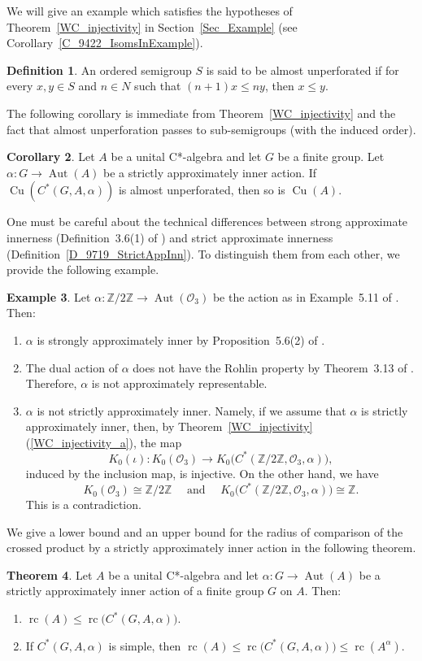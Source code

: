 \documentclass[10pt]{amsart}
\numberwithin{equation}{section}
\theoremstyle{definition}
\newtheorem{thm}{Theorem}[section]
\newtheorem{dfn}[thm]{Definition}
\newtheorem{cor}[thm]{Corollary}
\newtheorem{exa}[thm]{Example}
\newcommand{\af}{\alpha}
\newcommand{\Cu}{{\operatorname{Cu}}}
\newcommand{\Aut}{{\operatorname{Aut}}}
\newcommand{\rc}{{\operatorname{rc}}}
\newcommand{\ca}{C*-algebra}
\newcommand{\CGAa}{C^* (G, A, \af)}
\begin{document}
We will give an example which satisfies the hypotheses 
of Theorem~\ref{WC_injectivity} in Section~\ref{Sec_Example} (see Corollary~\ref{C_9422_IsomsInExample}).
\begin{dfn}
 An ordered semigroup $S$ is said to be almost unperforated if for every
$x, y \in S$ and $n \in N$ such that $(n+1) x \leq n y$, then $x \leq y$. 
\end{dfn}
%
The following corollary is immediate from Theorem~\ref{WC_injectivity} and the fact that 
almost unperforation passes to sub-semigroups (with the induced order).
% 
\begin{cor}
Let $A$ be a unital \ca{} and let $G$ be a finite group. Let $\alpha \colon G \to \Aut(A)$
be a strictly  approximately inner action.
If $\Cu (C^*(G, A, \alpha))$ is almost unperforated, then so is $\Cu (A)$.
\end{cor}
%
One must be careful about the technical differences between strong approximate innerness (Definition~3.6(1) of \cite{Iz1})  
and strict approximate innerness (Definition~\ref{D_9719_StrictAppInn}).
To distinguish them from each other, we provide the following example.
%
\begin{exa}
Let $\alpha \colon \mathbb{Z}/2 \mathbb{Z} \to \Aut(\mathcal{O}_3)$ be the action as in Example~5.11 of \cite{Iz1}.
Then:
\begin{enumerate}
\item
$\alpha$ is strongly approximately inner  by Proposition~5.6(2) of \cite{Iz1}.
\item
 The dual action of $\alpha$ does not have the Rohlin property by Theorem~3.13 of \cite{Iz1}.
 Therefore, $\alpha$ is not approximately representable.
\item
$\alpha$ is not strictly approximately inner. 
Namely, if we assume that $\alpha$ is strictly approximately inner, then, by 
Theorem~\ref{WC_injectivity}(\ref{WC_injectivity_a}), the map 
\[
K_0 (\iota) \colon K_{0} (\mathcal{O}_3) \to K_0 \big(C^*(\mathbb{Z}/2 \mathbb{Z}, \mathcal{O}_3, \alpha)\big),
\]
induced by the inclusion map, is injective. On the other hand, we have 
\[
K_{0} (\mathcal{O}_3) \cong \mathbb{Z}/2 \mathbb{Z}
\quad
\mbox{ and }
\quad
K_0 \big(C^*(\mathbb{Z}/2 \mathbb{Z}, \mathcal{O}_3, \alpha)\big) \cong \mathbb{Z}.
\]
This is a contradiction.
\end{enumerate}
\end{exa}
%
We give a lower bound and an upper bound for 
the radius of comparison of the crossed product by a strictly approximately inner action in the following theorem.
\begin{thm}\label{Thm_rc_In}
Let $A$ be a unital \ca{} and let  $\alpha \colon  G \to \Aut(A)$ be a strictly approximately inner action of a 
finite  group $G$ on $A$. Then:
\begin{enumerate}
\item\label{Thm_rc_In.a}
$\rc (A) \leq \rc \big( \CGAa\big)$.
\item\label{Thm_rc_In.b}
If $C^*(G, A, \alpha)$ is simple, then $\rc (A) \leq \rc \big(C^*(G, A, \alpha)\big) \leq \rc (A^{\alpha})$.
\end{enumerate}
\end{thm}
\end{document}
